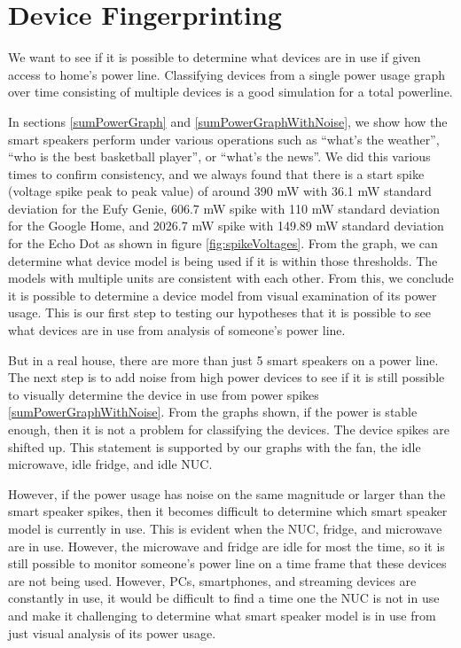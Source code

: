 \section{Device Fingerprinting}
We want to see if it is possible to determine what devices are in use if given access to home's power line. Classifying devices from a single power usage graph over time consisting of multiple devices is a good simulation for a total powerline.

In sections \ref{sumPowerGraph} and \ref{sumPowerGraphWithNoise}, we show how the smart speakers perform under various operations such as ``what's the weather'', ``who is the best basketball player'', or ``what's the news''. We did this various times to confirm consistency, and we always found that there is a start spike (voltage spike peak to peak value) of around 390 mW with 36.1 mW standard deviation for the Eufy Genie, 606.7 mW spike with 110 mW standard deviation for the Google Home, and 2026.7 mW spike with 149.89 mW standard deviation for the Echo Dot as shown in figure \ref{fig:spikeVoltages}. From the graph, we can determine what device model is being used if it is within those thresholds. The models with multiple units are consistent with each other. From this, we conclude it is possible to determine a device model from visual examination of its power usage. This is our first step to testing our hypotheses that it is possible to see what devices are in use from analysis of someone's power line.

But in a real house, there are more than just 5 smart speakers on a power line. The next step is to add noise from high power devices to see if it is still possible to visually determine the device in use from power spikes \ref{sumPowerGraphWithNoise}. From the graphs shown, if the power is stable enough, then it is not a problem for classifying the devices. The device spikes are shifted up. This statement is supported by our graphs with the fan, the idle microwave, idle fridge, and idle NUC.

However, if the power usage has noise on the same magnitude or larger than the smart speaker spikes, then it becomes difficult to determine which smart speaker model is currently in use. This is evident when the NUC, fridge, and microwave are in use. However, the microwave and fridge are idle for most the time, so it is still possible to monitor someone's power line on a time frame that these devices are not being used. However, PCs, smartphones, and streaming devices are constantly in use, it would be difficult to find a time one the NUC is not in use and make it challenging to determine what smart speaker model is in use from just visual analysis of its power usage.

